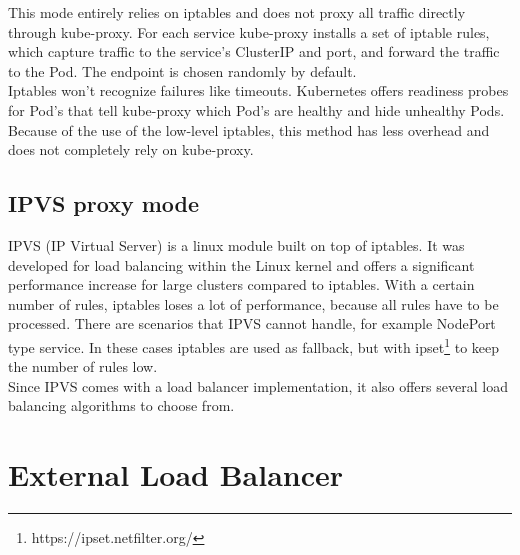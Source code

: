 This mode entirely relies on iptables and does not proxy all traffic directly through kube-proxy.
For each service kube-proxy installs a set of iptable rules, which capture traffic to the service's ClusterIP and port, and forward the traffic to the Pod.
The endpoint is chosen randomly by default.
\\
Iptables won't recognize failures like timeouts.
Kubernetes offers readiness probes for Pod's that tell kube-proxy which Pod's are healthy and hide unhealthy Pods.
\\
Because of the use of the low-level iptables, this method has less overhead and does not completely rely on kube-proxy.~\cite{KUBERNETES-SERVICE}

\subsection{IPVS proxy mode}

IPVS (IP Virtual Server) is a linux module built on top of iptables.
It was developed for load balancing within the Linux kernel and offers a significant performance increase for large clusters compared to iptables.
With a certain number of rules, iptables loses a lot of performance, because all rules have to be processed.
There are scenarios that IPVS cannot handle, for example NodePort type service.
In these cases iptables are used as fallback, but with ipset\footnote{https://ipset.netfilter.org/} to keep the number of rules low.
\\
Since IPVS comes with a load balancer implementation, it also offers several load balancing algorithms to choose from.~\cite{KUBERNETES-SERVICE}

\section{External Load Balancer}\label{sec:ExternalLoadBalancer}

